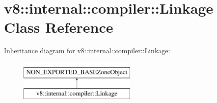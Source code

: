 \hypertarget{classv8_1_1internal_1_1compiler_1_1Linkage}{}\section{v8\+:\+:internal\+:\+:compiler\+:\+:Linkage Class Reference}
\label{classv8_1_1internal_1_1compiler_1_1Linkage}
Inheritance diagram for v8\+:\+:internal\+:\+:compiler\+:\+:Linkage\+:\begin{figure}[H]
\begin{center}
\leavevmode
\includegraphics[height=2.000000cm]{classv8_1_1internal_1_1compiler_1_1Linkage}
\end{center}
\end{figure}
